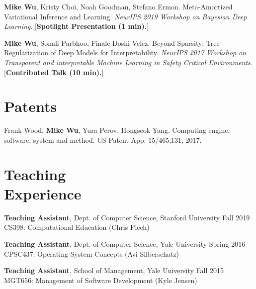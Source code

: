 \documentclass[margin, 10pt]{res} %
\begin{document}
\begin{resume}
\textbf{Mike Wu}, Kristy Choi, Noah Goodman, Stefano Ermon. Meta-Amortized Variational Inference and Learning. \textit{NeurIPS 2019 Workshop on Bayesian Deep Learning}. [\textbf{Spotlight Presentation (1 min).}]

\textbf{Mike Wu}, Sonali Parbhoo, Finale Doshi-Velez. Beyond Sparsity: Tree Regularization of Deep Models for Interpretability. \textit{NeurIPS 2017 Workshop on Transparent and interpretable Machine Learning in Safety Critical Environments}. [\textbf{Contributed Talk (10 min).}]


\section{Patents}

Frank Wood, \textbf{Mike Wu}, Yura Perov, Hongseok Yang. Computing engine, software, system and method. US Patent App. 15/465,131, 2017.


\section{Teaching \\ Experience}

\textbf{Teaching Assistant}, Dept. of Computer Science, Stanford University \hfill Fall 2019\\
CS398: Computational Education (Chris Piech)

\textbf{Teaching Assistant}, Dept. of Computer Science, Yale University \hfill Spring 2016\\
CPSC437: Operating System Concepts (Avi Silberschatz)

\textbf{Teaching Assistant}, School of Management, Yale University \hfill Fall 2015\\
MGT656: Management of Software Development (Kyle Jensen)



\end{resume}
\end{document}
